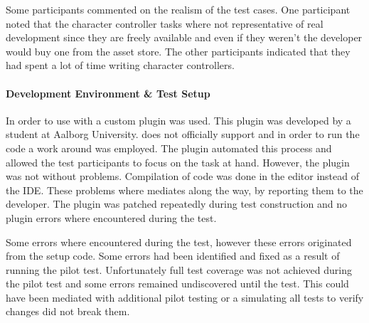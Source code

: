 Some participants commented on the realism of the test cases. One participant noted that the character controller tasks where not representative of real development since they are freely available and even if they weren't the developer would buy one from the asset store. The other participants indicated that they had spent a lot of time writing character controllers.

\paragraph{Development Environment \& Test Setup}
In order to use \fs with \unity a custom plugin was used. This plugin was developed by a student at Aalborg University\cite{fsharp2019plugin}. \unity does not officially support \fs and in order to run the \fs code a work around was employed. The plugin automated this process and allowed the test participants to focus on the task at hand. However, the plugin was not without problems. Compilation of \fs code was done in the \unity editor instead of the \gls{IDE}. These problems where mediates along the way, by reporting them to the developer. The plugin was patched repeatedly during test construction and no plugin errors where encountered during the test.

Some errors where encountered during the test, however these errors originated from the setup code. Some errors had been identified and fixed as a result of running the pilot test. Unfortunately full test coverage was not achieved during the pilot test and some errors remained undiscovered until the test. This could have been mediated with additional pilot testing or a simulating all tests to verify changes did not break them.
